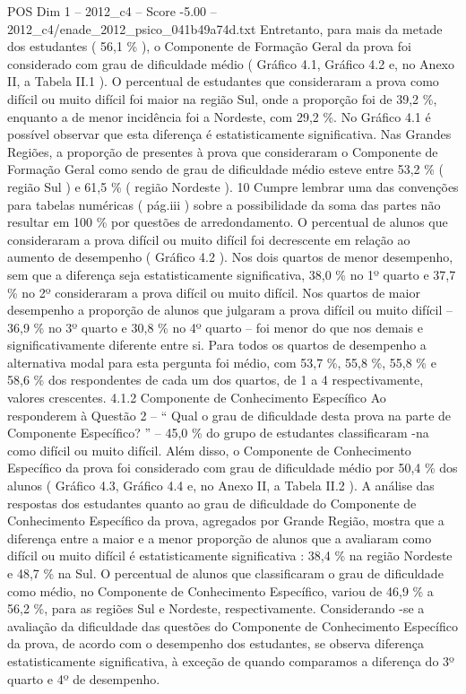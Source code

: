 \begin{textsample}{POS Dim 1 – 2012\_c4 – Score -5.00 – 2012\_c4/enade\_2012\_psico\_041b49a74d.txt}
Entretanto, para mais da metade dos estudantes ( 56,1 \% ), o Componente de Formação Geral da prova foi considerado com grau de dificuldade médio ( Gráfico 4.1, Gráfico 4.2 e, no Anexo II, a Tabela II.1 ).
O percentual de estudantes que consideraram a prova como difícil ou muito difícil foi maior na região Sul, onde a proporção foi de 39,2 \%, enquanto a de menor incidência foi a Nordeste, com 29,2 \%.
No Gráfico 4.1 é possível observar que esta diferença é estatisticamente significativa.
Nas Grandes Regiões, a proporção de presentes à prova que consideraram o Componente de Formação Geral como sendo de grau de dificuldade médio esteve entre 53,2 \% ( região Sul ) e 61,5 \% ( região Nordeste ). 10 Cumpre lembrar uma das convenções para tabelas numéricas ( pág.iii ) sobre a possibilidade da soma das partes não resultar em 100 \% por questões de arredondamento.
O percentual de alunos que consideraram a prova difícil ou muito difícil foi decrescente em relação ao aumento de desempenho ( Gráfico 4.2 ).
Nos dois quartos de menor desempenho, sem que a diferença seja estatisticamente significativa, 38,0 \% no 1º quarto e 37,7 \% no 2º consideraram a prova difícil ou muito difícil.
Nos quartos de maior desempenho a proporção de alunos que julgaram a prova difícil ou muito difícil – 36,9 \% no 3º quarto e 30,8 \% no 4º quarto – foi menor do que nos demais e significativamente diferente entre si.
Para todos os quartos de desempenho a alternativa modal para esta pergunta foi médio, com 53,7 \%, 55,8 \%, 55,8 \% e 58,6 \% dos respondentes de cada um dos quartos, de 1 a 4 respectivamente, valores crescentes. 4.1.2 Componente de Conhecimento Específico Ao responderem à Questão 2 – “ Qual o grau de dificuldade desta prova na parte de Componente Específico? ” – 45,0 \% do grupo de estudantes classificaram -na como difícil ou muito difícil.
Além disso, o Componente de Conhecimento Específico da prova foi considerado com grau de dificuldade médio por 50,4 \% dos alunos ( Gráfico 4.3, Gráfico 4.4 e, no Anexo II, a Tabela II.2 ).
A análise das respostas dos estudantes quanto ao grau de dificuldade do Componente de Conhecimento Específico da prova, agregados por Grande Região, mostra que a diferença entre a maior e a menor proporção de alunos que a avaliaram como difícil ou muito difícil é estatisticamente significativa : 38,4 \% na região Nordeste e 48,7 \% na Sul.
O percentual de alunos que classificaram o grau de dificuldade como médio, no Componente de Conhecimento Específico, variou de 46,9 \% a 56,2 \%, para as regiões Sul e Nordeste, respectivamente.
Considerando -se a avaliação da dificuldade das questões do Componente de Conhecimento Específico da prova, de acordo com o desempenho dos estudantes, se observa diferença estatisticamente significativa, à exceção de quando comparamos a diferença do 3º quarto e 4º de desempenho.

\end{textsample}
